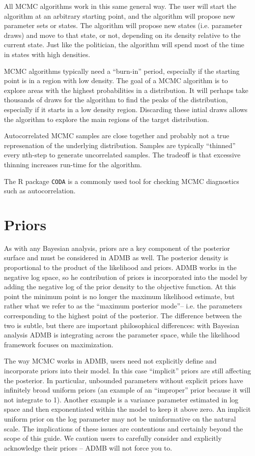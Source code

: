 \documentclass{article}\usepackage[]{graphicx}\usepackage[]{color}
\begin{document}
All MCMC algorithms work in this same general way. The user
will start the algorithm at an arbitrary starting point, and
the algorithm will propose new parameter sets or states. The
algorithm will propose new states (i.e. parameter draws) and
move to that state, or not, depending on its density
relative to the current state. Just like the politician, the
algorithm will spend most of the time in states with high
densities.

MCMC algorithms typically need a ``burn-in'' period,
especially if the starting point is in a region with low
density. The goal of a MCMC algorithm is to explore areas
with the highest probabilities in a distribution. It will
perhaps take thousands of draws for the algorithm to find
the peaks of the distribution, especially if it starts in a
low density region. Discarding these intial draws allows the
algorithm to explore the main regions of the target
distribution.

Autocorrelated MCMC samples are close together and probably
not a true represenation of the underlying
distribution. Samples are typically ``thinned'' every
nth-step to generate uncorrelated samples. The tradeoff is
that excessive thinning increases run-time for the
algorithm.

The R package \texttt{CODA} is a commonly used tool for
checking MCMC diagnostics such as autocorrelation.

\section{Priors}
As with any Bayesian analysis, priors are a key component of
the posterior surface and must be considered in ADMB as
well. The posterior density is proportional to the product
of the likelihood and priors. ADMB works in the negative log
space, so he contribution of priors is incorporated into the
model by adding the negative log of the prior density to the
objective function. At this point the minimum point is no
longer the maximum likelihood estimate, but rather what we
refer to as the ``maximum posterior mode''-- i.e. the
parameters corresponding to the highest point of the
posterior. The difference between the two is subtle, but
there are important philosophical differences: with Bayesian
analysis ADMB is integrating across the parameter space,
while the likelihood framework focuses on maximization.

The way MCMC works in ADMB, users need not explicitly define
and incorporate priors into their model. In this case
``implicit'' priors are still affecting the posterior. In
particular, unbounded parameters without explicit priors
have infinitely broad uniform priors (an example of an
``improper'' prior because it will not integrate to
1). Another example is a variance parameter estimated in log
space and then exponentiated within the model to keep it
above zero. An implicit uniform prior on the log parameter
may not be uninformative on the natural scale. The
implications of these issues are contentious and certainly
beyond the scope of this guide. We caution users to
carefully consider and explicitly acknowledge their priors
-- ADMB will not force you to.
\end{document}
